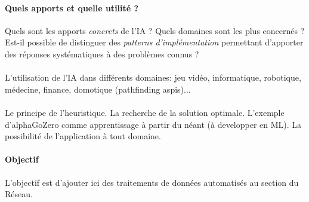 \paragraph{Quels apports et quelle utilité ?} Quels sont les apports \emph{concrets}
de l'IA ? Quels domaines sont les plus concernés ? Est-il possible de distinguer
des \emph{patterns d'implémentation} permettant d'apporter des réponses systématiques
à des problèmes connus ?

\paragraph{} L'utilisation de l'IA dans différents domaines: jeu vidéo, informatique,
robotique, médecine, finance, domotique (pathfinding aspis)...

\paragraph{} Le principe de l'heuristique. La recherche de la solution optimale.
L'exemple d'alphaGoZero comme apprentissage à partir du néant (à developper en ML).
La possibilité de l'application à tout domaine.

\paragraph{Objectif} L'objectif est d'ajouter ici des traitements de données automatisés au section
du Réseau.